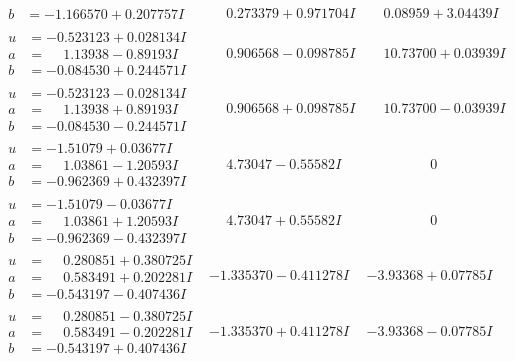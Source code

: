 \documentclass[1p]{elsarticle_modified}
\theoremstyle{definition}
\begin{document}
$$\begin{array}{c|c|c}
\begin{aligned}
b &= -1.166570 + 0.207757 I\end{aligned}
 & \phantom{-}0.273379 + 0.971704 I & \phantom{-}0.08959 + 3.04439 I \\ \hline\begin{aligned}
u &= -0.523123 + 0.028134 I \\
a &= \phantom{-}1.13938 - 0.89193 I \\
b &= -0.084530 + 0.244571 I\end{aligned}
 & \phantom{-}0.906568 - 0.098785 I & \phantom{-}10.73700 + 0.03939 I \\ \hline\begin{aligned}
u &= -0.523123 - 0.028134 I \\
a &= \phantom{-}1.13938 + 0.89193 I \\
b &= -0.084530 - 0.244571 I\end{aligned}
 & \phantom{-}0.906568 + 0.098785 I & \phantom{-}10.73700 - 0.03939 I \\ \hline\begin{aligned}
u &= -1.51079 + 0.03677 I \\
a &= \phantom{-}1.03861 - 1.20593 I \\
b &= -0.962369 + 0.432397 I\end{aligned}
 & \phantom{-}4.73047 - 0.55582 I & \phantom{-0.000000 } 0 \\ \hline\begin{aligned}
u &= -1.51079 - 0.03677 I \\
a &= \phantom{-}1.03861 + 1.20593 I \\
b &= -0.962369 - 0.432397 I\end{aligned}
 & \phantom{-}4.73047 + 0.55582 I & \phantom{-0.000000 } 0 \\ \hline\begin{aligned}
u &= \phantom{-}0.280851 + 0.380725 I \\
a &= \phantom{-}0.583491 + 0.202281 I \\
b &= -0.543197 - 0.407436 I\end{aligned}
 & -1.335370 - 0.411278 I & -3.93368 + 0.07785 I \\ \hline\begin{aligned}
u &= \phantom{-}0.280851 - 0.380725 I \\
a &= \phantom{-}0.583491 - 0.202281 I \\
b &= -0.543197 + 0.407436 I\end{aligned}
 & -1.335370 + 0.411278 I & -3.93368 - 0.07785 I \\ \hline\begin{aligned}

\end{aligned}
\end{array}$$
\end{document}
